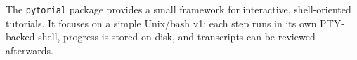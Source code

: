 The \texttt{pytorial} package provides a small framework for interactive,
shell-oriented tutorials.  It focuses on a simple Unix/bash v1: each step runs
in its own PTY-backed shell, progress is stored on disk, and transcripts can be
reviewed afterwards.
